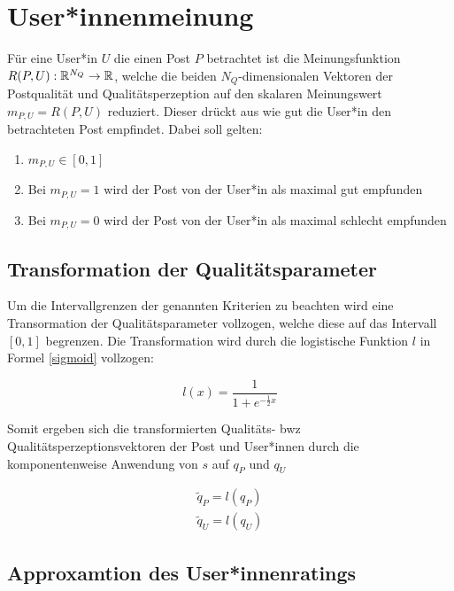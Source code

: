 \chapter{User*innenmeinung}
\label{chapter:bewertungsfunktionen}


Für eine User*in $U$ die einen Post $P$ betrachtet ist die Meinungsfunktion $R(P,U): \mathbb{R}^{N_Q} \rightarrow \mathbb{R}$, welche die beiden $N_Q$-dimensionalen Vektoren der Postqualität und Qualitätsperzeption auf den skalaren Meinungswert $m_{P,U} = R(P, U)$ reduziert. Dieser drückt aus wie gut die User*in den betrachteten Post empfindet. Dabei soll gelten:

\begin{enumerate}
	\item $m_{P,U} \in [0,1]$
	\item Bei $m_{P,U} = 1$ wird der Post von der User*in als maximal gut empfunden
	\item Bei $m_{P,U} = 0$ wird der Post von der User*in als maximal schlecht empfunden
\end{enumerate}

\section{Transformation der Qualitätsparameter}

Um die Intervallgrenzen der genannten Kriterien zu beachten wird eine Transormation der Qualitätsparameter vollzogen, welche diese auf das Intervall $[0,1]$ begrenzen. Die Transformation wird durch die logistische Funktion $l$ in Formel \ref{sigmoid} vollzogen:



\begin{equation}
\label{sigmoid}
l(x) = \frac{1}{1 + e^{-\frac{1}{2}x}}
\end{equation}


Somit ergeben sich die transformierten Qualitäts- bwz Qualitätsperzeptionsvektoren der Post und User*innen durch die komponentenweise Anwendung von $s$ auf $q_P$ und $q_U$

\begin{align}
\tilde{q}_P = l(q_P) \\
\tilde{q}_U = l(q_U) 
\end{align}

\section{Approxamtion des User*innenratings}

